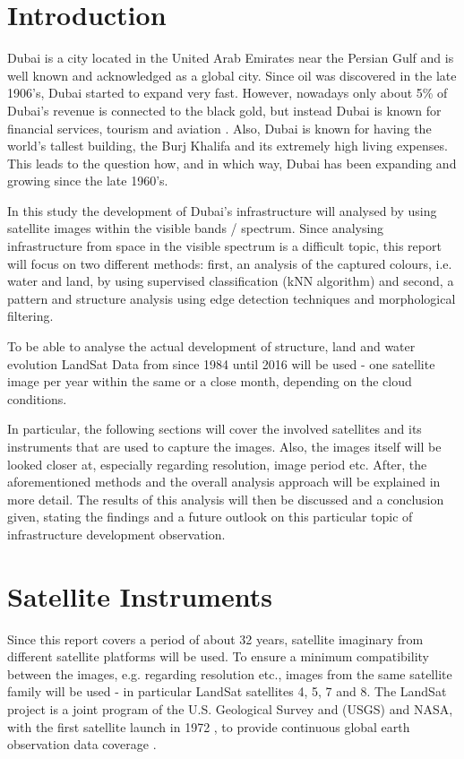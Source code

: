 \section{Introduction}
Dubai is a city located in the United Arab Emirates near the Persian Gulf and is well known and acknowledged as a global city. Since oil was discovered in the late 1906's, Dubai started to expand very fast. However, nowadays only about 5\% of Dubai's revenue is connected to the black gold, but instead Dubai is known for financial services, tourism and aviation \citep{wiki:dubai}. Also, Dubai is known for having the world's tallest building, the Burj Khalifa and its extremely high living expenses. This leads to the question how, and in which way, Dubai has been expanding and growing since the late 1960's.

In this study the development of Dubai's infrastructure will analysed by using satellite images within the visible bands / spectrum.
Since analysing infrastructure from space in the visible spectrum is a difficult topic, this report will focus on two different methods: first, an analysis of the captured colours, i.e. water and land, by using supervised classification (kNN algorithm) and second, a pattern and structure analysis using edge detection techniques and morphological filtering.

To be able to analyse the actual development of structure, land and water evolution LandSat Data from since 1984 until 2016 will be used - one satellite image per year within the same or a close month, depending  on the cloud conditions.

In particular, the following sections will cover the involved satellites and its instruments that are used to capture the images. Also, the images itself will be looked closer at, especially regarding resolution, image period etc. After, the aforementioned methods and the overall analysis approach will be explained in more detail. The results of this analysis will then  be discussed and a conclusion given, stating the findings and a future outlook on this particular topic of infrastructure development observation.

\section{Satellite Instruments}
Since this report covers a period of about 32 years, satellite imaginary from different satellite platforms will be used. To ensure a minimum compatibility between the images, e.g. regarding resolution etc., images from the same satellite family will be used - in particular LandSat satellites 4, 5, 7 and 8.
The LandSat project is a joint program of the U.S. Geological Survey and (USGS) and NASA, with the first satellite launch in 1972 \citep{pub:usgs}, to provide continuous global earth observation data coverage .

